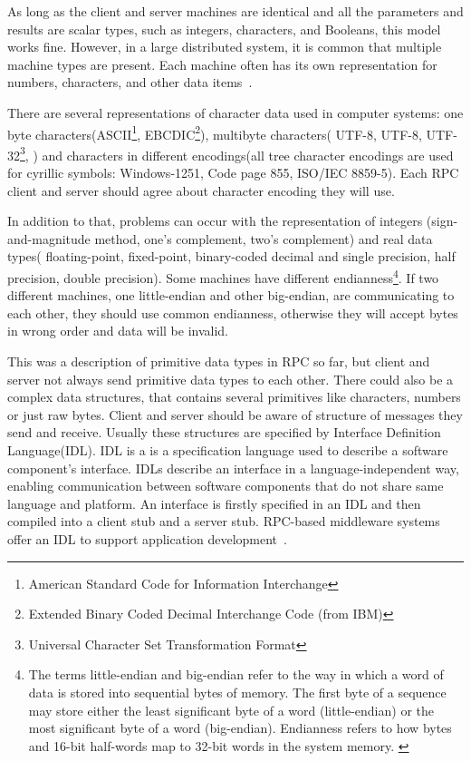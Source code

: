 As long as the client and server machines are identical and all the parameters
and results are scalar types, such as integers, characters, and Booleans, this model
works fine. 
However, in a large distributed system, it is common that multiple
machine types are present.
Each machine often has its own representation for
numbers, characters, and other data items~\cite{tanenbaum07}.

There are several representations of character data used in computer systems:
one byte characters(ASCII\footnote{ American Standard Code for Information
Interchange}, EBCDIC\footnote{Extended Binary Coded Decimal Interchange Code
(from IBM)}), multibyte characters( UTF-8, UTF-8, UTF-32\footnote{Universal
Character Set Transformation Format},  ) and characters in different
encodings(all tree character encodings are used for cyrillic symbols: 
Windows-1251, Code page 855, ISO/IEC 8859-5). Each RPC client and server should
agree about character encoding they will use.

In addition to that, problems can occur with the representation of integers
(sign-and-magnitude method, one’s complement, two’s complement) and
real data types( floating-point, fixed-point, binary-coded decimal and single
precision, half precision, double precision). Some machines have different
endianness\footnote{The terms little-endian and big-endian refer to the way in which a word of data is stored into sequential bytes of
memory. The first byte of a sequence may store either the least significant byte of a word (little-endian) or the most
significant byte of a word (big-endian). Endianness refers to how bytes and
16-bit half-words map to 32-bit words in the system memory. \cite{arm_endian}}.
If two different machines, one little-endian and other big-endian, are
communicating to each other, they should use common endianness, otherwise they
will accept bytes in wrong order and data will be invalid.

This was a description of primitive data types in RPC so far, but client and
server not always send primitive data types to each other. There could also be a
complex data structures, that contains several primitives like characters,
numbers or just raw bytes. Client and server should be aware of structure of
messages they send and receive. Usually these structures are specified by
Interface Definition Language(IDL).
IDL is a  is a specification language used to describe a software component's interface.
IDLs describe an interface in a language-independent way, enabling
communication between software components that do not share same language and
platform.
An interface is firstly specified in an IDL and then compiled into a
client stub and a server stub. RPC-based middleware systems
offer an IDL to support application development~\cite{tanenbaum07}.


